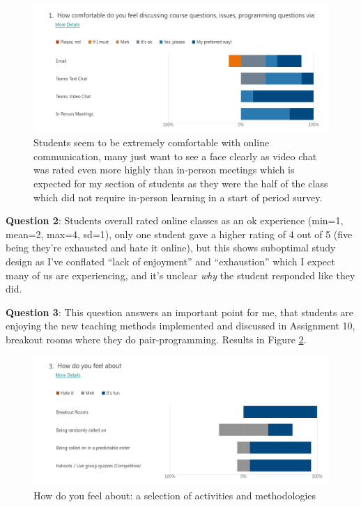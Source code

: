 \documentclass[paper=a4,justified,a4paper]{tufte-handout}
\begin{document}
\begin{figure}
\centering
\includegraphics{q1.png}
\caption{Students seem to be extremely comfortable with online
communication, many just want to see a face clearly as video chat was
rated even more highly than in-person meetings which is expected for my
section of students as they were the half of the class which did not
require in-person learning in a start of period survey.\label{fig:q1}}
\end{figure}

\textbf{Question 2}: Students overall rated online classes as an ok
experience (min=1, mean=2, max=4, sd=1), only one student gave a higher
rating of 4 out of 5 (five being they're exhausted and hate it online),
but this shows suboptimal study design as I've conflated ``lack of
enjoyment'' and ``exhaustion'' which I expect many of us are
experiencing, and it's unclear \emph{why} the student responded like
they did.

\textbf{Question 3}: This question answers an important point for me,
that students are enjoying the new teaching methods implemented and
discussed in Assignment 10, breakout rooms where they do
pair-programming. Results in Figure \ref{fig:q3}.

\begin{figure}
\centering
\includegraphics{./q3.png}
\caption{How do you feel about: a selection of activities and
methodologies\label{fig:q3}}
\end{figure}
\end{document}
